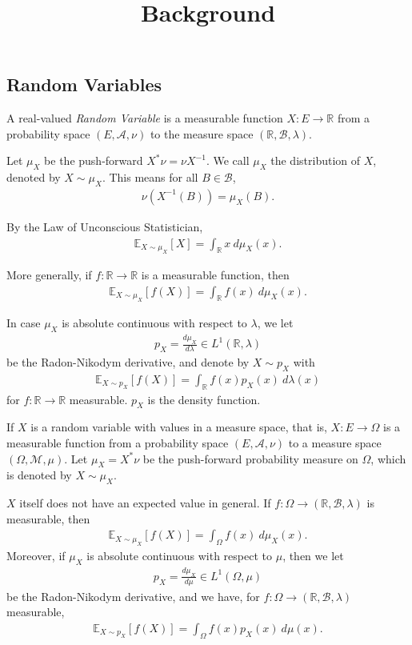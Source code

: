 \documentclass[12pt,oneside]{article}
\title{Background}
\date{} %
\newcommand{\ra}[0]{\rightarrow}
\newcommand{\R}[0]{\mathbb{R}}
\newcommand{\CM}[0]{\mathcal{M}}
\newcommand{\CA}[0]{\mathcal{A}}
\newcommand{\CB}[0]{\mathcal{B}}
\newcommand{\BE}[0]{\mathbb{E}}
\newcommand{\ali}[1]{\begin{align*}#1\end{align*}}
\theoremstyle{plain}
\theoremstyle{remark}
\begin{document}
\onehalfspace

\sloppy
\maketitle
\subsection*{Random Variables}
A real-valued {\it Random Variable} is a measurable function $X: E \ra \R$ from a probability space $(E, \CA, \nu)$ to the measure space $(\R, \CB, \lambda)$. 

Let $\mu_X$ be the push-forward $X^*\nu = \nu X^{-1}$. We call $\mu_X$ the distribution of $X$, denoted by $X \sim \mu_X$. This means for all $B \in \CB$, 
\ali{\nu(X^{-1}(B)) = \mu_X(B).} 

By the Law of Unconscious Statistician, 
\ali{\BE_{X \sim \mu_X}[X] = \int_\R x \ d\mu_X(x).}

More generally, if $f: \R \ra \R$ is a measurable function, then 
\ali{\BE_{X \sim \mu_X}[f(X)] = \int_\R f(x) \ d\mu_X(x).}

In case $\mu_X$ is absolute continuous with respect to $\lambda$, we let 
\ali{p_X = \frac{d\mu_X}{d\lambda} \in L^1(\R, \lambda)}
be the Radon-Nikodym derivative, and denote by $X \sim p_X$ with 
\ali{\BE_{X \sim p_X} [f(X)] = \int_\R f(x)p_X(x) \ d\lambda(x)}
for $f: \R \ra \R$ measurable. $p_X$ is the density function.

If $X$ is a random variable with values in a measure space, that is, $X: E \ra \Omega$ is a measurable function from a probability space $(E, \CA, \nu)$ to a measure space $(\Omega, \CM, \mu)$. Let $\mu_X = X^*\nu$ be the push-forward probability measure on $\Omega$, which is denoted by $X \sim \mu_X$.

$X$ itself does not have an expected value in general. If $f: \Omega \ra (\R, \CB, \lambda)$ is measurable, then 
\ali{\BE_{X \sim \mu_X}[f(X)] = \int_{\Omega} f(x) \ d\mu_X(x).}
Moreover, if $\mu_X$ is absolute continuous with respect to $\mu$, then we let 
\ali{p_X = \frac{d\mu_X}{d\mu} \in L^1(\Omega, \mu)}
be the Radon-Nikodym derivative, and we have, for $f: \Omega \ra (\R, \CB, \lambda)$ measurable,
\ali{\BE_{X \sim p_X} [f(X)] = \int_\Omega f(x)p_X(x) \ d\mu(x).}
\end{document}

